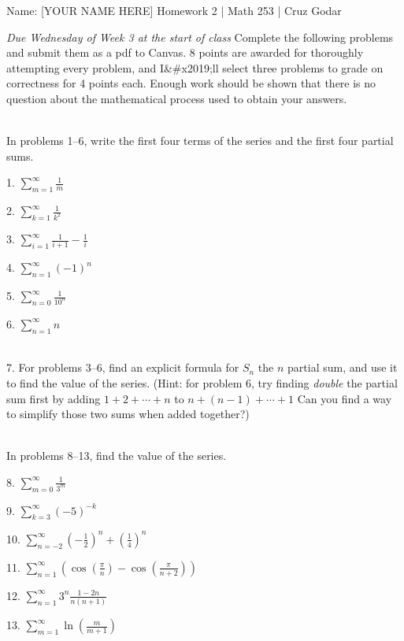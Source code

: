 \documentclass{article}
\begin{document}
\Large Name: [YOUR NAME HERE] \hfill Homework 2 | Math 253 | Cruz Godar \vspace{4pt} \normalsize

\textit{Due Wednesday of Week 3 at the start of class}
Complete the following problems and submit them as a pdf to Canvas. 8 points are awarded for thoroughly attempting every problem, and I&#x2019;ll select three problems to grade on correctness for 4 points each. Enough work should be shown that there is no question about the mathematical process used to obtain your answers.

~\\
In problems 1--6, write the first four terms of the series and the first four partial sums.

1. $\displaystyle \sum_{m = 1}^\infty \frac{1}{m}$

2. $\displaystyle \sum_{k = 1}^\infty \frac{1}{k^2}$

3. $\displaystyle \sum_{i = 1}^\infty \frac{1}{i + 1} - \frac{1}{i}$

4. $\displaystyle \sum_{n = 1}^\infty (-1)^n$

5. $\displaystyle \sum_{n = 0}^\infty \frac{1}{10^n}$

6. $\displaystyle \sum_{n = 1}^\infty n$

~\\

7. For problems 3--6, find an explicit formula for $S_n$ the $n$ partial sum, and use it to find the value of the series. (Hint: for problem 6, try finding \textit{double} the partial sum first by adding $1 + 2 + \cdots + n$ to $n + (n - 1) + \cdots + 1$ Can you find a way to simplify those two sums when added together?)

~\\
In problems 8--13, find the value of the series.

8. $\displaystyle \sum_{m = 0}^\infty \frac{1}{3^m}$

9. $\displaystyle \sum_{k = 3}^\infty (-5)^{-k}$

10. $\displaystyle \sum_{n = -2}^\infty \left( -\frac{1}{2} \right)^n + \left( \frac{1}{4} \right)^n$

11. $\displaystyle \sum_{n = 1}^\infty \left( \cos\left( \frac{\pi}{n} \right) - \cos\left( \frac{\pi}{n + 2} \right) \right)$

12. $\displaystyle \sum_{n = 1}^\infty 3^n\frac{1 - 2n}{n(n + 1)}$

13. $\displaystyle \sum_{m = 1}^\infty \ln\left( \frac{m}{m + 1} \right)$
\end{document}
